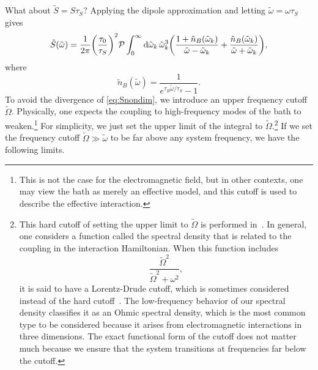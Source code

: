 \documentclass[../thesis.tex]{subfiles}
\begin{document}
What about $\tilde{S} = S\tau_S$? Applying the dipole approximation and letting
$\tilde{\omega} = \omega\tau_S$ gives 
\begin{equation}
  \tilde{S}(\tilde{\omega})
  = \frac{1}{2\pi} {\qty(\frac{\tau_0}{\tau_S})}^2
  \pv\int_0^\infty \dd{\tilde{\omega}_k} \tilde{\omega}_k^3
  \qty(\frac{1 + \tilde{n}_B(\tilde{\omega}_k)}{\tilde{\omega} - \tilde{\omega}_k}
  + \frac{\tilde{n}_B(\tilde{\omega}_k)}{\tilde{\omega} + \tilde{\omega}_k}),
  \label{eq:Snondim}
\end{equation}
where
\begin{equation}
  \tilde{n}_B(\tilde{\omega})
  = \frac{1}{e^{\tau_B \tilde{\omega} / \tau_S} - 1}.
\end{equation}
To avoid the divergence of \cref{eq:Snondim}, we introduce an upper frequency
cutoff $\tilde{\Omega}$. Physically, one expects the coupling to high-frequency
modes of the bath to weaken.\footnote{%
  This is not the case for the electromagnetic field, but in other contexts, one
  may view the bath as merely an effective model, and this cutoff is used to
  describe the effective interaction.
}
For simplicity, we just set the upper limit of the integral to
$\tilde{\Omega}$.\footnote{%
  This hard cutoff of setting the upper limit to $\tilde{\Omega}$ is performed
  in~\cite[p.~265]{opensys}. In general, one considers a function called the
  spectral density that is related to the coupling in the interaction
  Hamiltonian. When this function includes
  \begin{equation}
    \frac{\tilde{\Omega}^2}{\tilde{\Omega}^2 + {\omega}^2},
  \end{equation}
  it is said to have a Lorentz-Drude cutoff, which is sometimes considered
  instead of the hard cutoff~\cite[p.~175]{opensys}. The low-frequency behavior
  of our spectral density classifies it as an Ohmic spectral density, which is
  the most common type to be considered because it arises from electromagnetic
  interactions in three dimensions. The exact functional form of the cutoff does
  not matter much because we ensure that the system transitions at frequencies
  far below the cutoff.
}
If we set the frequency cutoff $\tilde{\Omega} \gg \tilde{\omega}$ to be
far above any system frequency, we have the following limits.
\end{document}
